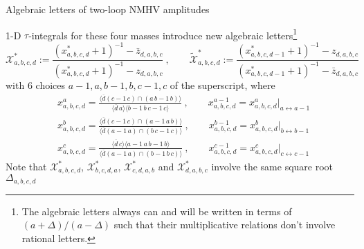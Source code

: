 \documentclass[10pt]{beamer}
\begin{document}
\begin{frame}{Algebraic letters of two-loop NMHV amplitudes}

\footnotesize{
  1-D $\tau$-integrals for these four masses introduce new algebraic letters\footnote{The algebraic letters always can and will be written in terms of $(a+\Delta)/(a-\Delta)$ such that their multiplicative relations don't involve rational letters.}
  \begin{equation*}
    \mathcal{X}_{a,b,c,d}^{\ast}:=\frac{(x^{\ast}_{a,b,c,d}+1)^{-1}-\bar{z}_{d,a,b,c}}{(x^{\ast}_{a,b,c,d}+1)^{-1}-z_{d,a,b,c}}\:, \qquad     
    \widetilde{\mathcal{X}}_{a,b,c,d}^{\ast}:=\frac{(x^{\ast}_{a,b,c,d-1}+1)^{-1}-z
    _{d,a,b,c}}{(x^{\ast}_{a,b,c,d-1}+1)^{-1}-\bar{z}_{d,a,b,c}}
\end{equation*}
with 6 choices $a{-}1,a,b{-}1,b,c{-}1,c$ of the superscript, where
\begin{align*}
    & x^{a}_{a,b,c,d}=\frac{\langle\overline{d} (c{-}1\,c)\cap(a\,b{-}1\,b) \rangle}{\langle \overline{d}\,a\rangle \langle b{-}1\,b\,c{-}1\,c\rangle} \:, \qquad x^{a-1}_{a,b,c,d}= x^{a}_{a,b,c,d}\vert_{a\leftrightarrow a{-}1}\\
    &x_{a,b,c,d}^{b}=\frac{\langle \overline{d} (c{-}1\,c)\cap (a{-}1\,a\,b)\rangle}{\langle \overline{d} (a{-}1\,a)\cap(b\,c{-}1\,c)\rangle} \:, \qquad x^{b-1}_{a,b,c,d}= x^{b}_{a,b,c,d}\vert_{b\leftrightarrow b{-}1} \\
    &x_{a,b,c,d}^{c}=\frac{\langle \overline{d}\,c\rangle\langle a{-}1\,a\,b{-}1\,b\rangle}{\langle \overline{d}(a{-}1\,a)\cap(b{-}1\,b\,c)\rangle} \:, \qquad x^{c-1}_{a,b,c,d}= x^{c}_{a,b,c,d}\vert_{c\leftrightarrow c{-}1}  \nonumber  
\end{align*}
Note that $\mathcal{X}_{a,b,c,d}^{\ast}$, $\mathcal{X}_{b,c,d,a}^{\ast}$, $\mathcal{X}_{c,d,a,b}^{\ast}$ and $\mathcal{X}_{d,a,b,c}^{\ast}$ involve the same square root $\Delta_{a,b,c,d}$

}

\end{frame}
\end{document}
